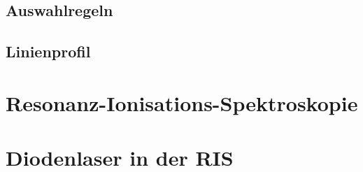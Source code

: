 




\subsection{Auswahlregeln}\label{subsec:auswahlregeln}


\subsection{Linienprofil}\label{sec:linienprofil}

\section{Resonanz-Ionisations-Spektroskopie}\label{sec:ris}

\section{Diodenlaser in der RIS}\label{sec:diodenlaser}
